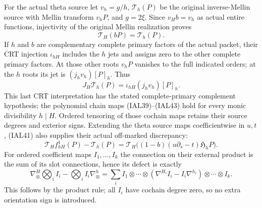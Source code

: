 \documentclass[11pt,a4paper]{article}
\theoremstyle{definition}
\begin{document}
For the actual theta source let $v_h=g/h$, $\mathcal T_h(P)$ be the
original inverse-Mellin source with Mellin transform $v_hP$, and
$g=2\xi$.  Since $v_H b=v_h$ as actual entire functions, injectivity
of the original Mellin realization proves
\begin{equation}
 \mathcal T_H(bP)=\mathcal T_h(P).                    \tag{IAL44}
\end{equation}
If $h$ and $b$ are complementary complete primary factors of the
actual packet, their CRT injection $\iota_{hH}$ includes the $h$
jets and assigns zero to the other complete primary factors.
At those other roots $v_hP$ vanishes to the full indicated orders;
at the $h$ roots its jet is $(j_hv_h)[P]_h$.  Thus
\begin{equation}
 J_H\mathcal T_h(P)=\iota_{hH}(j_hv_h)[P]_h.          \tag{IAL45}
\end{equation}
This last CRT interpretation has the stated complete-primary
complement hypothesis; the polynomial chain maps (IAL39)--(IAL43)
hold for every monic divisibility $h\mid H$.  Ordered tensoring of
those cochain maps retains their source degrees and exterior signs.
Extending the theta source maps coefficientwise in $u,t$, (IAL41)
also supplies their actual off-marked discrepancy:
\begin{equation}
 \mathcal T_Hf_{hH}^1(P)-\mathcal T_h(P)
 =\mathcal T_H\bigl((1-b)(u\partial_s-t)\mathfrak H_hP\bigr).
                                                        \tag{IAL45a}
\end{equation}
For ordered coefficient maps $I_1,\ldots,I_k$ the connection on their
external product is the sum of its slot connections, hence its defect
is exactly
\begin{equation}
 \nabla^{H}_{\otimes}\bigotimes_i I_i
 -\bigotimes_i I_i\nabla^{h}_{\otimes}
 =\sum_i I_1\otimes\cdots\otimes
 (\nabla^{H_i}I_i-I_i\nabla^{h_i})\otimes\cdots\otimes I_k.
                                                        \tag{IAL45b}
\end{equation}
This follows by the product rule; all $I_i$ have cochain degree zero,
so no extra orientation sign is introduced.
\end{document}

